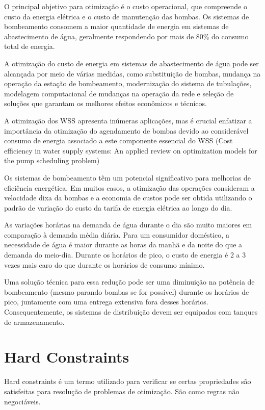O principal objetivo para otimização é o custo operacional, que compreende o custo da energia elétrica e o custo de manutenção das bombas.\cite{rfc2} Os sistemas de bombeamento consomem a maior quantidade de energia em sistemas de abastecimento de água, geralmente respondendo por mais de 80\% do consumo total de energia.\cite{rfc8}

A otimização do custo de energia em sistemas de abastecimento de água pode ser alcançada por meio de várias medidas, como substituição de bombas, mudança na operação da estação de bombeamento, modernização do sistema de tubulações, modelagem computacional de mudanças na operação da rede e seleção de soluções que garantam os melhores efeitos econômicos e técnicos.\cite{rfc7}

A otimização dos WSS apresenta inúmeras aplicações, mas é crucial enfatizar a importância da otimização do agendamento de bombas devido ao considerável consumo de energia associado a este componente essencial do WSS (Cost efficiency in water supply systems: An applied review on optimization models for the pump scheduling problem)

Os sistemas de bombeamento têm um potencial significativo para melhorias de eficiência energética. Em muitos casos, a otimização das operações consideram a velocidade dixa da bombas e a economia de custos pode ser obtida utilizando o padrão de variação do custo da tarifa de energia elétrica ao longo do dia.\cite{rfc8}

As variações horárias na demanda de água durante o dia são muito maiores em comparação à demanda média diária. Para um consumidor doméstico, a necessidade de água é maior durante as horas da manhã e da noite do que a demanda do meio-dia. Durante os horários de pico, o custo de energia é 2 a 3 vezes mais caro do que durante os horários de consumo mínimo.

Uma solução técnica para essa redução pode ser uma diminuição na potência de bombeamento (mesmo parando bombas se for possível) durante os horários de pico, juntamente com uma entrega extensiva fora desses horários. Consequentemente, os sistemas de distribuição devem ser equipados com tanques de armazenamento.


\section{Hard Constraints}

Hard constraints é um termo utilizado para verificar se certas propriedades são satisfeitas para resolução de problemas de otimização.\cite{rfc16} São como regras não negociáveis.

